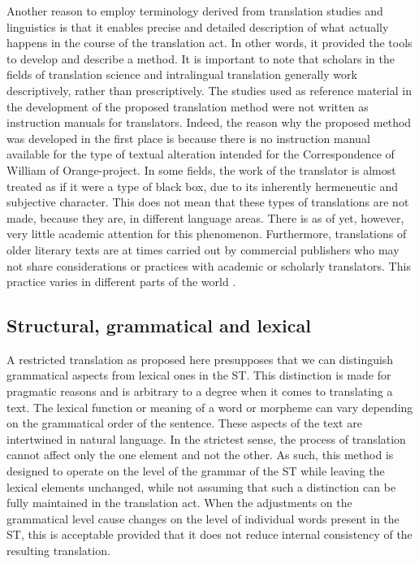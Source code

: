 \begin{paper}
Another reason to employ terminology derived from translation studies
and linguistics is that it enables precise and detailed description of
what actually happens in the course of the translation act. In other
words, it provided the tools to develop and describe a method. It is
important to note that scholars in the fields of translation science and
intralingual translation generally work descriptively, rather than
prescriptively. The studies used as reference material in the
development of the proposed translation method were not written as
instruction manuals for translators. Indeed, the reason why the proposed method was developed in the first place is because there is no instruction manual available for the type of textual alteration intended for the Correspondence of William of Orange-project. In some fields, the work
of the translator is almost treated as if it were a type of black box,
due to its inherently hermeneutic and subjective character. This does
not mean that these types of translations are not made, because they
are, in different language areas. There is as of yet, however, very
little academic attention for this phenomenon. Furthermore, translations
of older literary texts are at times carried out by commercial
publishers who may not share considerations or practices with academic
or scholarly translators. This practice varies in different parts of the world \citep[577]{berk_albachten_intralingual_571}.

\subsection{Structural, grammatical and
lexical}

A restricted translation as proposed here presupposes that we can
distinguish grammatical aspects from lexical ones in the ST. This
distinction is made for pragmatic reasons and is arbitrary to a degree
when it comes to translating a text. The lexical function or meaning of
a word or morpheme can vary depending on the grammatical order of the
sentence. These aspects of the text are intertwined in natural language.
In the strictest sense, the process of translation cannot affect only
the one element and not the other. As such, this method is designed to
operate on the level of the grammar of the ST while leaving the lexical
elements unchanged, while not assuming that such a distinction can be
fully maintained in the translation act. When the adjustments on the
grammatical level cause changes on the level of individual words present
in the ST, this is acceptable provided that it does not reduce internal
consistency of the resulting translation.


\end{paper}
